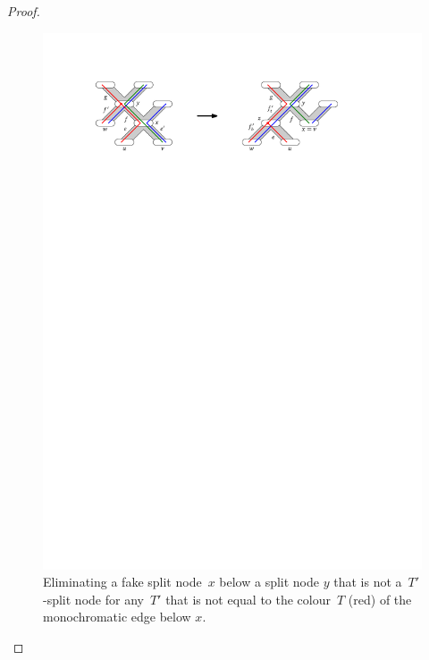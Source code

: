 \begin{proof}
  \begin{figure}
    \centering
    \includegraphics{../figs/ch4/self-split-transformation}
    \caption{Eliminating a fake split node~$x$ below a split node $y$ {that is not a~$T'$-split node for any~$T'$ that is not equal to the colour~$T$ (red) of the monochromatic edge below $x$.}}
    \label{fig:self-split-transformation}
  \end{figure}


\end{proof}
